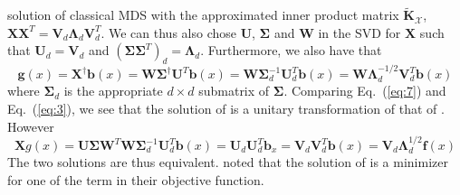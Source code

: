 \documentclass{article}
\begin{document}
solution of classical MDS with the approximated inner product matrix
$\tilde{\mathbf{K}}_{\mathcal{X}}$, $\mathbf{X}\mathbf{X}^{T} =
\mathbf{V}_d\bm{\Lambda}_{d}\mathbf{V}_{d}^{T}$. We can thus also chose
$\mathbf{U}$, $\bm{\Sigma}$ and $\mathbf{W}$ in the SVD for
$\mathbf{X}$ such that $\mathbf{U}_d = \mathbf{V}_d$ and
$(\bm{\Sigma}\bm{\Sigma}^{T})_{d} = \bm{\Lambda}_d$. Furthermore, we
also have that
\begin{equation}
  \label{eq:7}
  \mathbf{g}(x) = \mathbf{X}^{\dagger} \mathbf{b}(x) = \mathbf{W} \bm{\Sigma}^{\dagger}\mathbf{U}^{T}
  \mathbf{b}(x) = \mathbf{W} \bm{\Sigma}_d^{-1} \mathbf{U}_d^{T}
  \mathbf{b}(x) = \mathbf{W} \bm{\Lambda}_d^{-1/2} \mathbf{V}_d^{T}
  \mathbf{b}(x)
\end{equation}
where $\bm{\Sigma}_d$ is the appropriate $d \times d$ submatrix of
$\bm{\Sigma}$. Comparing Eq.~(\ref{eq:7}) and Eq.~(\ref{eq:3}), we see
that the solution of \cite{anderson03:_gener} is a unitary
transformation of that of
\cite{bengio04:_out_lle_isomap_mds_eigen}. However 
\begin{equation*}
  \mathbf{X}g(x) =
  \mathbf{U} \bm{\Sigma}
  \mathbf{W}^{T}\mathbf{W}\bm{\Sigma}_d^{-1}\mathbf{U}_d^{T}\mathbf{b}(x)
  = \mathbf{U}_d\mathbf{U}_d^{T}\mathbf{b}_x =
  \mathbf{V}_d\mathbf{V}_d^{T} \mathbf{b}(x) = \mathbf{V}_d \bm{\Lambda}_d^{1/2}\mathbf{f}(x)
\end{equation*}
The two solutions are thus equivalent. \cite{trosset08} noted that the solution
of \cite{anderson03:_gener} is a minimizer for one of the term in
their objective function.  
\end{document}
